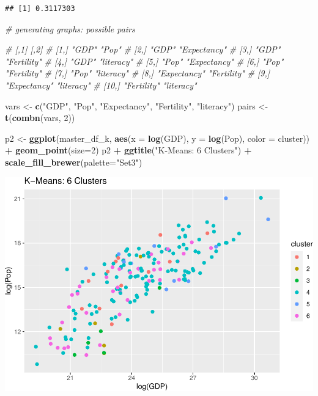 \documentclass[]{article}
\newenvironment{Shaded}{\begin{snugshade}}{\end{snugshade}}
\newcommand{\CommentTok}[1]{\textcolor[rgb]{0.56,0.35,0.01}{\textit{#1}}}
\newcommand{\DataTypeTok}[1]{\textcolor[rgb]{0.13,0.29,0.53}{#1}}
\newcommand{\DecValTok}[1]{\textcolor[rgb]{0.00,0.00,0.81}{#1}}
\newcommand{\KeywordTok}[1]{\textcolor[rgb]{0.13,0.29,0.53}{\textbf{#1}}}
\newcommand{\NormalTok}[1]{#1}
\newcommand{\OperatorTok}[1]{\textcolor[rgb]{0.81,0.36,0.00}{\textbf{#1}}}
\newcommand{\StringTok}[1]{\textcolor[rgb]{0.31,0.60,0.02}{#1}}
\begin{document}
\begin{verbatim}
## [1] 0.3117303
\end{verbatim}

\begin{Shaded}
\begin{Highlighting}[]
\CommentTok{# generating graphs: possible pairs}

\CommentTok{#       [,1]         [,2]        }
\CommentTok{#  [1,] "GDP"        "Pop"       }
\CommentTok{#  [2,] "GDP"        "Expectancy"}
\CommentTok{#  [3,] "GDP"        "Fertility" }
\CommentTok{#  [4,] "GDP"        "literacy"  }
\CommentTok{#  [5,] "Pop"        "Expectancy"}
\CommentTok{#  [6,] "Pop"        "Fertility" }
\CommentTok{#  [7,] "Pop"        "literacy"  }
\CommentTok{#  [8,] "Expectancy" "Fertility" }
\CommentTok{#  [9,] "Expectancy" "literacy"  }
\CommentTok{# [10,] "Fertility"  "literacy"  }

\NormalTok{vars <-}\StringTok{ }\KeywordTok{c}\NormalTok{(}\StringTok{"GDP"}\NormalTok{, }\StringTok{"Pop"}\NormalTok{, }\StringTok{"Expectancy"}\NormalTok{, }\StringTok{"Fertility"}\NormalTok{, }\StringTok{"literacy"}\NormalTok{)}
\NormalTok{pairs <-}\StringTok{ }\KeywordTok{t}\NormalTok{(}\KeywordTok{combn}\NormalTok{(vars, }\DecValTok{2}\NormalTok{))}

\NormalTok{p2 <-}\StringTok{ }\KeywordTok{ggplot}\NormalTok{(master_df_k, }\KeywordTok{aes}\NormalTok{(}\DataTypeTok{x =} \KeywordTok{log}\NormalTok{(GDP), }\DataTypeTok{y =} \KeywordTok{log}\NormalTok{(Pop), }\DataTypeTok{color =}\NormalTok{ cluster)) }\OperatorTok{+}
\StringTok{  }\KeywordTok{geom_point}\NormalTok{(}\DataTypeTok{size=}\DecValTok{2}\NormalTok{)}
\NormalTok{p2 }\OperatorTok{+}\StringTok{ }\KeywordTok{ggtitle}\NormalTok{(}\StringTok{"K-Means: 6 Clusters"}\NormalTok{) }\OperatorTok{+}\StringTok{ }\KeywordTok{scale_fill_brewer}\NormalTok{(}\DataTypeTok{palette=}\StringTok{"Set3"}\NormalTok{)}
\end{Highlighting}
\end{Shaded}

\includegraphics{eda_files/figure-latex/unnamed-chunk-26-1.pdf}
\end{document}
